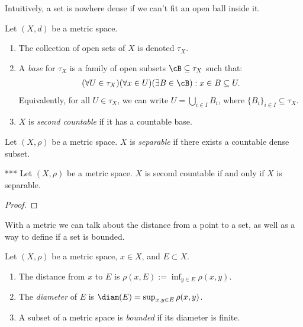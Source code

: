     Intuitively, a set is nowhere dense if we can't fit an open ball inside it.

    \begin{definition}
        Let $(X,d)$ be a metric space. 
        \begin{enumerate}[label = (\arabic*),itemsep=1pt,topsep=3pt]
            \item The collection of open sets of $X$ is denoted $\tau_X$.
            \item A \textit{base} for $\tau_X$ is a family of open subsets $\cB \subseteq \tau_X$ such that:
                \begin{equation*}
                \begin{split}
                    (\forall U \in \tau_X)(\forall x\in U)(\exists B \in \cB):x \in B \subseteq U.
                \end{split}
                \end{equation*}
            Equivalently, for all $U \in \tau_X$, we can write $U = \bigcup_{i \in I}B_i$, where $\{B_i\}_{i \in I} \subseteq \tau_X$.

            \item $X$ is \textit{second countable} if it has a countable base.
        \end{enumerate}
    \end{definition}

    \begin{definition}
        Let $(X,\rho)$ be a metric space. $X$ is \textit{separable} if there exists a countable dense subset.
    \end{definition}

    \begin{proposition}***
        Let $(X,\rho)$ be a metric space. $X$ is second countable if and only if $X$ is separable.
    \end{proposition}
        \begin{proof}
            
        \end{proof}

    With a metric we can talk about the distance from a point to a set, as well as a way to define if a set is bounded.

    \begin{definition}
        Let $(X,\rho)$ be a metric space, $x \in X$, and $E \subset X$.
        \begin{enumerate}[label = (\arabic*),itemsep=1pt,topsep=3pt]
            \item The distance from $x$ to $E$ is $\rho(x,E) := \inf_{y \in E}\rho(x,y)$.
            \item The \textit{diameter} of $E$ is $\diam(E) = \sup_{x,y \in E}\rho(x,y)$.
            \item A subset of a metric space is \textit{bounded} if its diameter is finite.
        \end{enumerate}
    \end{definition}

